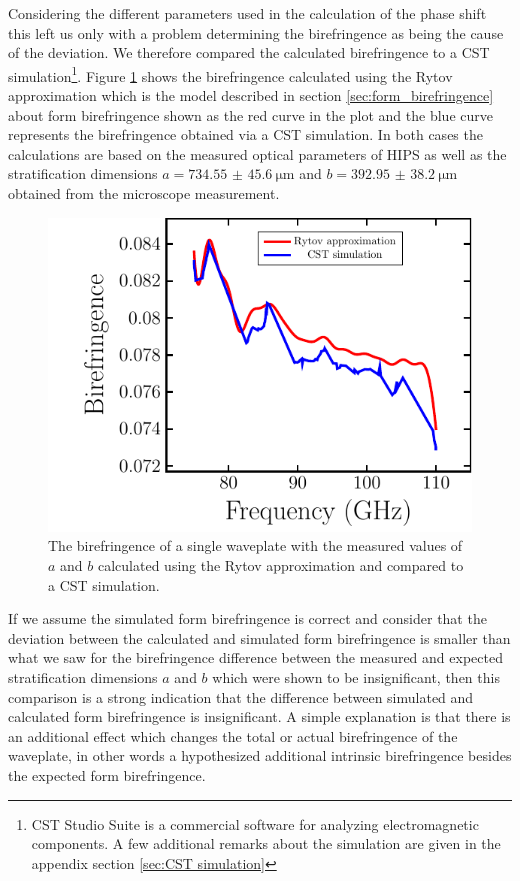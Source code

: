 Considering the different parameters used in the calculation of the phase shift this left us only with a problem determining the birefringence as being the cause of the deviation. We therefore compared the calculated birefringence to a CST simulation\footnote{CST Studio Suite is a commercial software for analyzing electromagnetic components. A few additional remarks about the simulation are given in the appendix section \ref{sec:CST simulation}}. Figure \ref{fig:CSTvsFormBF} shows the birefringence calculated using the Rytov approximation which is the model described in section \ref{sec:form_birefringence} about form birefringence shown as the red curve in the plot and the blue curve represents the birefringence obtained via a CST simulation. In both cases the calculations are based on the measured optical parameters of HIPS as well as the stratification dimensions $a=\SI[separate-uncertainty = true]{734.55(4560)}{\micro \meter}$ and $b=\SI[separate-uncertainty = true]{392.95(3820)}{\micro \meter}$ obtained from the microscope measurement.

\begin{figure}[H]
    \centering
    \includegraphics[scale=.7]{images/results/plots/polymer/CSTvsFormBF.pdf}
    \caption{The birefringence of a single waveplate with the measured values of $a$ and $b$ calculated using the Rytov approximation and compared to a CST simulation.}
    \label{fig:CSTvsFormBF}
\end{figure}

If we assume the simulated form birefringence is correct and consider that the deviation between the calculated and simulated form birefringence is smaller than what we saw for the birefringence difference between the measured and expected stratification dimensions $a$ and $b$ which were shown to be insignificant, then this comparison is a strong indication that the difference between simulated and calculated form birefringence is insignificant. A simple explanation is that there is an additional effect which changes the total or actual birefringence of the waveplate, in other words a hypothesized additional intrinsic birefringence besides the expected form birefringence. 

